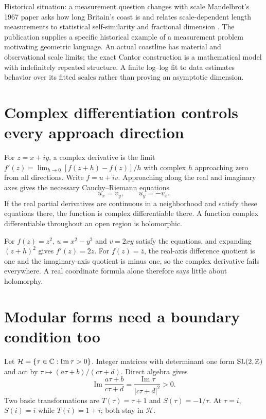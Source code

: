 \begin{learningcard}[breakable=false]{Historical situation: a measurement question changes with scale}
Mandelbrot's 1967 paper asks how long Britain's coast is and relates
scale-dependent length measurements to statistical self-similarity and
fractional dimension \citep{mandelbrot1967long}. The publication supplies a
specific historical example of a measurement problem motivating geometric
language. An actual coastline has material and observational scale limits;
the exact Cantor construction is a mathematical model with indefinitely
repeated structure. A finite log--log fit to data estimates behavior over
its fitted scales rather than proving an asymptotic dimension.
\end{learningcard}

\section{Complex differentiation controls every approach direction}
For $z=x+iy$, a complex derivative is the limit
$f'(z)=\lim_{h\to0}[f(z+h)-f(z)]/h$ with complex $h$ approaching zero
from all directions. Write $f=u+iv$. Approaching along the real and imaginary
axes gives the necessary Cauchy--Riemann equations
\[
 u_x=v_y,\qquad u_y=-v_x.
\]
If the real partial derivatives are continuous in a neighborhood and satisfy
these equations there, the function is complex differentiable there. A
function complex differentiable throughout an open region is holomorphic.

For $f(z)=z^2$, $u=x^2-y^2$ and $v=2xy$ satisfy the equations, and
expanding $(z+h)^2$ gives $f'(z)=2z$. For $f(z)=\overline z$,
the real-axis difference quotient is one and the imaginary-axis quotient
is minus one, so the complex derivative fails everywhere. A real
coordinate formula alone therefore says little about holomorphy.

\section{Modular forms need a boundary condition too}
Let $\mathcal H=\{\tau\in\mathbb{C}:\operatorname{Im}\tau>0\}$.
Integer matrices with determinant one form $\mathrm{SL}(2,\mathbb{Z})$ and act by
$\tau\mapsto(a\tau+b)/(c\tau+d)$. Direct algebra gives
\[
 \operatorname{Im}\frac{a\tau+b}{c\tau+d}
 =\frac{\operatorname{Im}\tau}{|c\tau+d|^2}>0.
\]
Two basic transformations are $T(\tau)=\tau+1$ and $S(\tau)=-1/\tau$.
At $\tau=i$, $S(i)=i$ while $T(i)=1+i$; both stay in $\mathcal H$.

